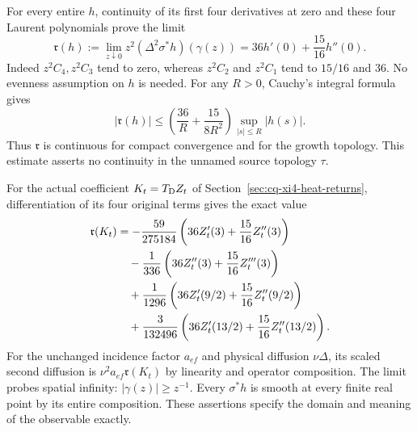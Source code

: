 For every entire $h$, continuity of its first four derivatives at
zero and these four Laurent polynomials prove the limit
\begin{equation}
 \mathfrak r(h):=
 \lim_{z\downarrow0}z^2(\Delta^2\sigma^*h)(\gamma(z))
 =36h'(0)+\frac{15}{16}h''(0).
 \label{eq:cq-retained-spatial-residue}
\end{equation}
Indeed $z^2C_4,z^2C_3$ tend to zero, whereas $z^2C_2$ and
$z^2C_1$ tend to $15/16$ and $36$. No evenness assumption on
$h$ is needed. For any $R>0$, Cauchy's integral formula gives
\[
 |\mathfrak r(h)|\le
 \left(\frac{36}{R}+\frac{15}{8R^2}\right)
       \sup_{|s|\le R}|h(s)| .
\]
Thus $\mathfrak r$ is continuous for compact convergence and for
the growth topology. This estimate asserts no continuity in the
unnamed source topology $\tau$.

For the actual coefficient $K_t=T_{\rm D}Z_t$ of
Section~\ref{sec:cq-xi4-heat-returns}, differentiation of its
four original terms gives the exact value
\begin{align}
 \mathfrak r(K_t)
 &=-\frac{59}{275184}
       \left(36Z_t'(3)+\frac{15}{16}Z_t''(3)\right)\notag\\
 &\quad-\frac1{336}
       \left(36Z_t''(3)+\frac{15}{16}Z_t'''(3)\right)\notag\\
 &\quad+\frac1{1296}
       \left(36Z_t'(9/2)+\frac{15}{16}Z_t''(9/2)\right)\notag\\
 &\quad+\frac3{132496}
       \left(36Z_t'(13/2)+\frac{15}{16}Z_t''(13/2)\right).
 \label{eq:cq-xi4-spatial-residue}
\end{align}
For the unchanged incidence factor $a_{ef}$ and physical
diffusion $\nu\Delta$, its scaled second diffusion is
$\nu^2a_{ef}\mathfrak r(K_t)$ by linearity and operator composition.
The limit probes spatial infinity: $|\gamma(z)|\ge z^{-1}$.
Every $\sigma^*h$ is smooth at every finite real point by its
entire composition. These assertions specify the domain and
meaning of the observable exactly.

